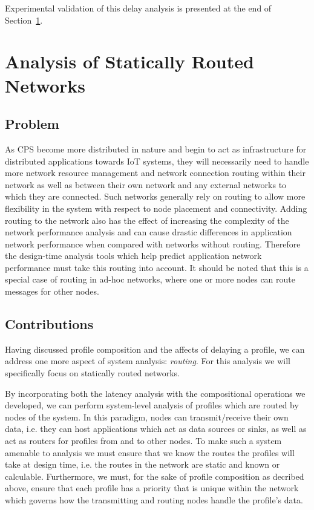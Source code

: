 Experimental validation of this delay analysis is presented at the end
of Section~\ref{sec:routing}.

\newpage

\section{Analysis of Statically Routed Networks}
\label{sec:routing}

\subsection{Problem}
As CPS become more distributed in nature and begin to act as
infrastructure for distributed applications towards IoT systems, they
will necessarily need to handle more network resource management and
network connection routing within their network as well as between
their own network and any external networks to which they are
connected.  Such networks generally rely on routing to allow more
flexibility in the system with respect to node placement and
connectivity.  Adding routing to the network also has the effect of
increasing the complexity of the network performance analysis and can
cause drastic differences in application network performance when
compared with networks without routing.  Therefore the design-time
analysis tools which help predict application network performance must
take this routing into account.  It should be noted that this is a
special case of routing in ad-hoc networks, where one or more nodes
can route messages for other nodes.

\subsection{Contributions}
Having discussed profile composition and the affects of delaying a
profile, we can address one more aspect of system analysis:
\emph{routing}.  For this analysis we will specifically focus on
statically routed networks.

By incorporating both the latency analysis with the compositional
operations we developed, we can perform system-level analysis of profiles
which are routed by nodes of the system.  In this paradigm, nodes can
transmit/receive their own data, i.e. they can host applications which
act as data sources or sinks, as well as act as routers for profiles from
and to other nodes.  To make such a system amenable to analysis we
must ensure that we know the routes the profiles will take at design
time, i.e. the routes in the network are static and known or
calculable.  Furthermore, we must, for the sake of profile composition as
decribed above, ensure that each profile has a priority that is unique
within the network which governs how the transmitting and routing
nodes handle the profile's data.

